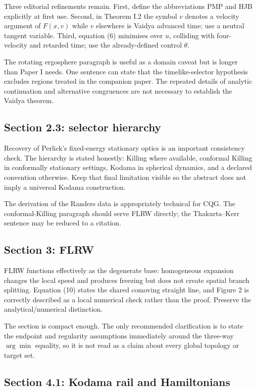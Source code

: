 \documentclass[11pt,a4paper]{article}
\begin{document}
Three editorial refinements remain. First, define the abbreviations PMP and HJB explicitly at
first use. Second, in Theorem I.2 the symbol $v$ denotes a velocity argument of $F(x,v)$ while
$v$ elsewhere is Vaidya advanced time; use a neutral tangent variable. Third, equation (6)
minimises over $u$, colliding with four-velocity and retarded time; use the already-defined
control $\theta$.

The rotating ergosphere paragraph is useful as a domain caveat but is longer than Paper I needs.
One sentence can state that the timelike-selector hypothesis excludes regions treated in the
companion paper. The repeated details of analytic continuation and alternative congruences are
not necessary to establish the Vaidya theorem.

\subsection{Section 2.3: selector hierarchy}

Recovery of Perlick's fixed-energy stationary optics is an important consistency check. The
hierarchy is stated honestly: Killing where available, conformal Killing in conformally
stationary settings, Kodama in spherical dynamics, and a declared convention otherwise. Keep
that final limitation visible so the abstract does not imply a universal Kodama construction.

The derivation of the Randers data is appropriately technical for CQG. The conformal-Killing
paragraph should serve FLRW directly; the Thakurta--Kerr sentence may be reduced to a citation.

\subsection{Section 3: FLRW}

FLRW functions effectively as the degenerate base: homogeneous expansion changes the local
speed and produces freezing but does not create spatial branch splitting. Equation (10) states
the shared comoving straight line, and Figure 2 is correctly described as a local numerical
check rather than the proof. Preserve the analytical/numerical distinction.

The section is compact enough. The only recommended clarification is to state the endpoint and
regularity assumptions immediately around the three-way $\arg\min$ equality, so it is not read
as a claim about every global topology or target set.

\subsection{Section 4.1: Kodama rail and Hamiltonians}
\end{document}
